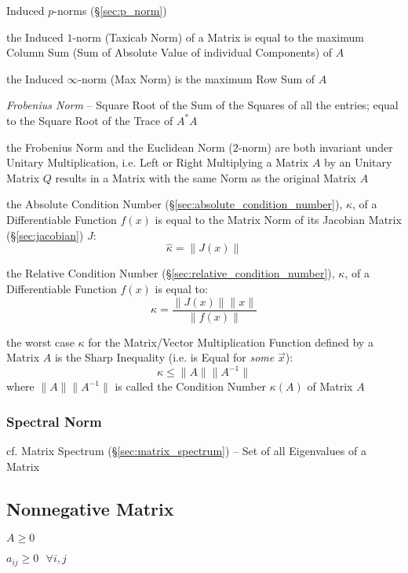 Induced $p$-norms (\S\ref{sec:p_norm})

the Induced $1$-norm (Taxicab Norm) of a Matrix is equal to the maximum Column
Sum (Sum of Absolute Value of individual Components) of $A$

the Induced $\infty$-norm (Max Norm) is the maximum Row Sum of $A$


\emph{Frobenius Norm} -- Square Root of the Sum of the Squares of all the
entries; equal to the Square Root of the Trace of $A^*A$


the Frobenius Norm and the Euclidean Norm ($2$-norm) are both invariant under
Unitary Multiplication, i.e. Left or Right Multiplying a Matrix $A$ by an
Unitary Matrix $Q$ results in a Matrix with the same Norm as the original
Matrix $A$

the Absolute Condition Number (\S\ref{sec:absolute_condition_number}),
$\hat{\kappa}$, of a Differentiable Function $f(x)$ is equal to the Matrix Norm
of its Jacobian Matrix (\S\ref{sec:jacobian}) $J$:
\[
  \hat{\kappa} = \|J(x)\|
\]

the Relative Condition Number (\S\ref{sec:relative_condition_number}),
$\kappa$, of a Differentiable Function $f(x)$ is equal to:
\[
  \kappa = \frac{\|J(x)\| \|x\|}{\|f(x)\|}
\]

the worst case $\kappa$ for the Matrix/Vector Multiplication Function defined
by a Matrix $A$ is the Sharp Inequality (i.e. is Equal for \emph{some}
$\vec{x}$):
\[
  \kappa \leq \|A\|\|A^{-1}\|
\]
where $\|A\|\|A^{-1}\|$ is called the Condition Number $\kappa(A)$ of Matrix
$A$



\subsubsection{Spectral Norm}\label{sec:spectral_norm}

cf. Matrix Spectrum (\S\ref{sec:matrix_spectrum}) -- Set of all Eigenvalues of
a Matrix



\subsection{Nonnegative Matrix}\label{sec:nonnegative_matrix}

$A \geq 0$

$a_{ij} \geq 0 \ \ \ \forall i,j$



